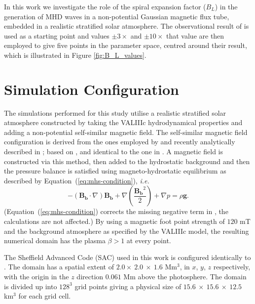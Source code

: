 In this work we investigate the role of the spiral expansion factor ($B_L$) in the generation of MHD waves in a non-potential Gaussian magnetic flux tube, embedded in a realistic stratified solar atmosphere.
The observational result of \cite{bonet2008} is used as a starting point and values $\pm 3\times$ and $\pm 10\times$ that value are then employed to give five points in the parameter space, centred around their result, which is illustrated in Figure \ref{fig:B_L_values}.


\section{Simulation Configuration}\label{sec:simconfig}
The simulations performed for this study utilise a realistic stratified solar atmosphere constructed by taking the VALIIIc \citep{vernazza1981} hydrodynamical properties and adding a non-potential self-similar magnetic field.
The self-similar magnetic field configuration is derived from the ones employed by \citet{fedun2011} and recently analytically described in \cite{gent2013, gent2014}; based on \citet{schluter1958, deinzer1965, low1980, schussler2005}, and identical to the one in \cite{mumford2015}.
A magnetic field is constructed via this method, then added to the hydrostatic background and then the pressure balance is satisfied using magneto-hydrostatic equilibrium as described by Equation~(\ref{eq:mhs-condition}), \textit{i.e.}
\begin{equation}
-(\mathbf{B_b}\cdot \nabla)\mathbf{B_b} + \nabla\left(\frac{\mathbf{B_b}^2}{2}\right) + \nabla p = \rho\mathbf{g}.
\label{eq:mhs-condition}
\end{equation}
(Equation~(\ref{eq:mhs-condition}) corrects the missing negative term in \cite{mumford2015}, the calculations are not affected.)
By using a magnetic foot point strength of $120$ mT and the background atmosphere as specified by the VALIIIc model, the resulting numerical domain has the plasma $\beta > 1$ at every point.

The Sheffield Advanced Code (SAC) \citep{Shelyag2008} used in this work is configured identically to \cite{mumford2015}. The domain has a spatial extent of $2.0 \times\ 2.0\ \times\ 1.6$ Mm$^3$, in $x$, $y$, $z$ respectively, with the origin in the $z$ direction $0.061$ Mm above the photosphere. The domain is divided up into $128^3$ grid points giving a physical size of $15.6\ \times\ 15.6\ \times\ 12.5$ km$^3$ for each grid cell.

